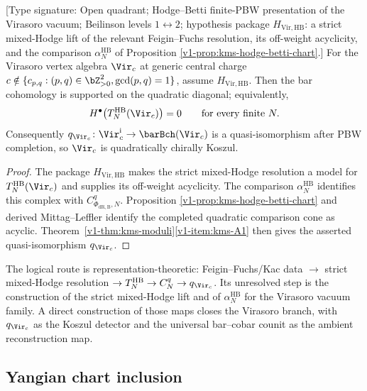 \begin{theorem}
\label{v1-thm:kms-virasoro-noncircular}
\ClaimStatusConditional
\textup{[Type signature: Open quadrant; Hodge--Betti finite-PBW
presentation of the Virasoro vacuum; Beilinson levels
$1\leftrightarrow2$; hypothesis package $H_{\mathrm{Vir,HB}}$:
a strict mixed-Hodge lift of the relevant Feigin--Fuchs resolution,
its off-weight acyclicity, and the comparison
$\alpha^{\mathrm{HB}}_N$ of Proposition
\ref{v1-prop:kms-hodge-betti-chart}.]}
For the Virasoro vertex algebra $\Vir_c$ at generic central
charge $c \notin \{c_{p,q} : (p,q) \in \bZ^2_{>0},
\gcd(p,q)=1\}$, assume $H_{\mathrm{Vir,HB}}$.  Then the bar
cohomology is supported on the quadratic diagonal; equivalently,
\[
 H^\bullet\!\left(T^{\mathrm{HB}}_N(\Vir_c)\right)=0
 \qquad\text{for every finite }N.
\]
Consequently $q_{\Vir_c}\colon\Vir_c^{\mathrm i}\to
\barBch(\Vir_c)$ is a quasi-isomorphism after PBW completion, so
$\Vir_c$ is quadratically chirally Koszul.
\end{theorem}

\begin{proof}
The package $H_{\mathrm{Vir,HB}}$ makes the strict
mixed-Hodge resolution a model for $T^{\mathrm{HB}}_N(\Vir_c)$ and
supplies its off-weight acyclicity.  The comparison
$\alpha^{\mathrm{HB}}_N$ identifies this complex with
$C^q_{\Phi_{\mathrm{dR,B}},N}$.  Proposition
\ref{v1-prop:kms-hodge-betti-chart} and derived
Mittag--Leffler identify the completed quadratic comparison cone as
acyclic.  Theorem~\ref{v1-thm:kms-moduli}\ref{v1-item:kms-A1}
then gives the asserted quasi-isomorphism $q_{\Vir_c}$.
\end{proof}

\begin{remark}
\label{v1-rem:kms-fm197-closed}
The logical route is representation-theoretic:
Feigin--Fuchs/Kac data $\to$ strict mixed-Hodge resolution
$\to T^{\mathrm{HB}}_N\to C^q_N\to q_{\Vir_c}$.  Its unresolved
step is the construction of the strict mixed-Hodge lift and of
$\alpha^{\mathrm{HB}}_N$ for the Virasoro vacuum family.  A direct
construction of those maps closes the Virasoro branch, with
$q_{\Vir_c}$ as the Koszul detector and the universal bar--cobar
counit as the ambient reconstruction map.
\end{remark}

\subsection{Yangian chart inclusion}

